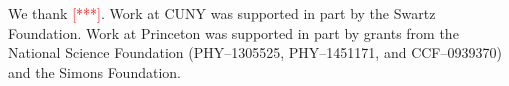\documentclass[aps,twocolumn,floats,nofootinbib,prl]{revtex4}
\begin{document}
\begin{acknowledgments}
We thank \textcolor{red}{[***]}.
Work at CUNY was supported in part by the Swartz Foundation.  Work at Princeton was supported in part by grants from the National Science Foundation (PHY--1305525, PHY--1451171, and CCF--0939370) and the Simons Foundation.
\end{acknowledgments}

%
\begin{thebibliography}{99}
%
\end{thebibliography}
\end{document}
